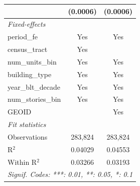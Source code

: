 \begin{tabular}{lcc}
                                                                       & (0.0006)               & (0.0006)\\   
   \midrule
   \emph{Fixed-effects}\\
   period\_fe                                                          & Yes                    & Yes\\  
   census\_tract                                                       & Yes                    & \\  
   num\_units\_bin                                                     & Yes                    & Yes\\  
   building\_type                                                      & Yes                    & Yes\\  
   year\_blt\_decade                                                   & Yes                    & Yes\\  
   num\_stories\_bin                                                   & Yes                    & Yes\\  
   GEOID                                                               &                        & Yes\\  
   \midrule
   \emph{Fit statistics}\\
   Observations                                                        & 283,824                & 283,824\\  
   R$^2$                                                               & 0.04029                & 0.04553\\  
   Within R$^2$                                                        & 0.03266                & 0.03193\\  
   \midrule \midrule
   \multicolumn{3}{l}{\emph{Signif. Codes: ***: 0.01, **: 0.05, *: 0.1}}\\
\end{tabular}
\par\endgroup
\begingroup
\centering
